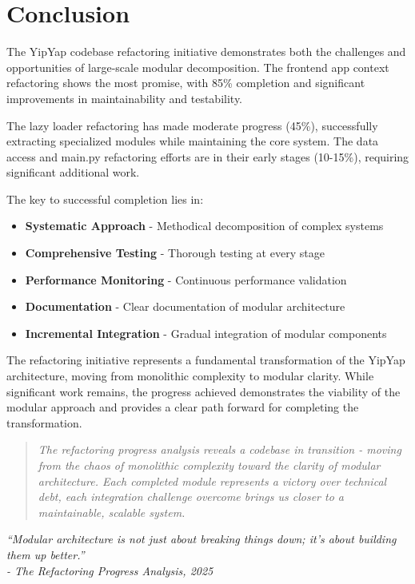 \documentclass[11pt]{article}
\begin{document}
\section{Conclusion}

The YipYap codebase refactoring initiative demonstrates both the challenges and opportunities of large-scale modular decomposition. The frontend app context refactoring shows the most promise, with 85\% completion and significant improvements in maintainability and testability.

The lazy loader refactoring has made moderate progress (45\%), successfully extracting specialized modules while maintaining the core system. The data access and main.py refactoring efforts are in their early stages (10-15\%), requiring significant additional work.

The key to successful completion lies in:

\begin{itemize}
\item \textbf{Systematic Approach} - Methodical decomposition of complex systems
\item \textbf{Comprehensive Testing} - Thorough testing at every stage
\item \textbf{Performance Monitoring} - Continuous performance validation
\item \textbf{Documentation} - Clear documentation of modular architecture
\item \textbf{Incremental Integration} - Gradual integration of modular components
\end{itemize}

The refactoring initiative represents a fundamental transformation of the YipYap architecture, moving from monolithic complexity to modular clarity. While significant work remains, the progress achieved demonstrates the viability of the modular approach and provides a clear path forward for completing the transformation.

\begin{quote}
\emph{The refactoring progress analysis reveals a codebase in transition - moving from the chaos of monolithic complexity toward the clarity of modular architecture. Each completed module represents a victory over technical debt, each integration challenge overcome brings us closer to a maintainable, scalable system.}
\end{quote}

\vfill

\textit{``Modular architecture is not just about breaking things down; it's about building them up better.''} \\
\textit{- The Refactoring Progress Analysis, 2025}
\end{document}
